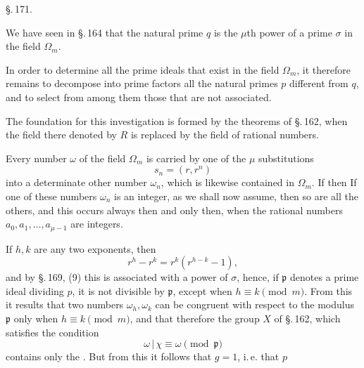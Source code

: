 \begin{center}
\S.\,171.

\end{center}

We have seen in \S.\,164 that the natural prime $q$
is the $\mu$th power of a prime $\sigma$ in the field $\Omega_m$.

In order to determine all the prime ideals that exist in the
field $\Omega_m$, it therefore remains to decompose into prime factors
all the natural primes $p$ different from $q$, and to select from
among them those that are not associated.

The foundation for this investigation is formed by the theorems
of \S.\,162, when the field there denoted by $R$ is replaced by
the field of rational numbers.

Every number $\omega$ of the field $\Omega_m$ is carried by one of the $\mu$ substitutions
\[
s_n = (r, r^n)
\]
into a determinate other number $\omega_n$, which is likewise contained
in $\Omega_m$. If
then
If one of these numbers $\omega_n$ is an integer, as we shall now
assume, then so are all the others, and this occurs always then
and only then, when the rational numbers
$a_0, a_1, \ldots, a_{\mu-1}$ are integers.

If $h, k$ are any two exponents, then
\[
r^h - r^k = r^k(r^{h-k} - 1),
\]
and by \S.\,169, (9) this is associated with a power of $\sigma$,
hence, if $\mathfrak{p}$ denotes a prime ideal dividing $p$, it is not
divisible by $\mathfrak{p}$, except when $h \equiv k \pmod{m}$. From this it results
that two numbers $\omega_h, \omega_k$ can be congruent with respect to the modulus $\mathfrak{p}$ only when $h \equiv k \pmod{m}$, and that therefore the
group $X$ of \S.\,162, which satisfies the condition
\[
\omega\,|\,\chi \equiv \omega \pmod{\mathfrak{p}}
\]
contains only the . But from this it
follows that $g = 1$, i.\,e. that $p$ 
